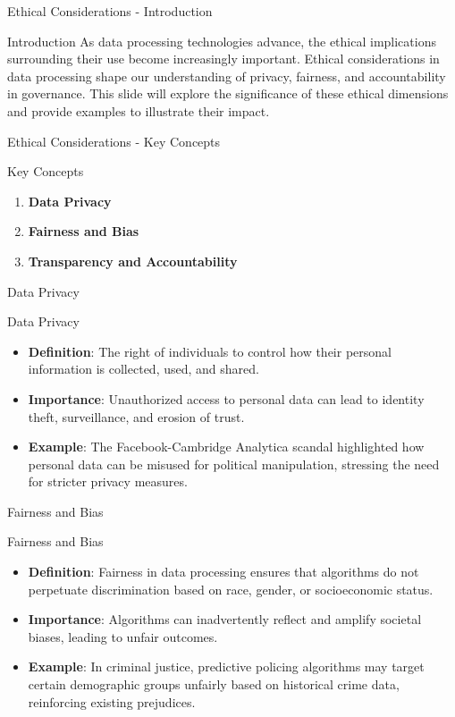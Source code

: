 \documentclass[aspectratio=169]{beamer}
\begin{document}
\begin{frame}[fragile]{Ethical Considerations - Introduction}
  \begin{block}{Introduction}
    As data processing technologies advance, the ethical implications surrounding their use become increasingly important. Ethical considerations in data processing shape our understanding of privacy, fairness, and accountability in governance. This slide will explore the significance of these ethical dimensions and provide examples to illustrate their impact.
  \end{block}
\end{frame}

\begin{frame}[fragile]{Ethical Considerations - Key Concepts}
  \begin{block}{Key Concepts}
    \begin{enumerate}
      \item \textbf{Data Privacy}
      \item \textbf{Fairness and Bias}
      \item \textbf{Transparency and Accountability}
    \end{enumerate}
  \end{block}
\end{frame}

\begin{frame}[fragile]{Data Privacy}
  \begin{block}{Data Privacy}
    \begin{itemize}
      \item \textbf{Definition}: The right of individuals to control how their personal information is collected, used, and shared.
      \item \textbf{Importance}: Unauthorized access to personal data can lead to identity theft, surveillance, and erosion of trust.
      \item \textbf{Example}: The Facebook-Cambridge Analytica scandal highlighted how personal data can be misused for political manipulation, stressing the need for stricter privacy measures.
    \end{itemize}
  \end{block}
\end{frame}

\begin{frame}[fragile]{Fairness and Bias}
  \begin{block}{Fairness and Bias}
    \begin{itemize}
      \item \textbf{Definition}: Fairness in data processing ensures that algorithms do not perpetuate discrimination based on race, gender, or socioeconomic status.
      \item \textbf{Importance}: Algorithms can inadvertently reflect and amplify societal biases, leading to unfair outcomes.
      \item \textbf{Example}: In criminal justice, predictive policing algorithms may target certain demographic groups unfairly based on historical crime data, reinforcing existing prejudices.
    \end{itemize}
  \end{block}
\end{frame}
\end{document}
